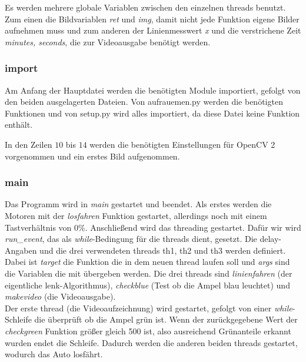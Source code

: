 \documentclass[a4paper, 12pt]{scrartcl}
\begin{document}
Es werden mehrere globale Variablen zwischen den einzelnen threads benutzt. Zum einen die Bildvariablen \textit{ret} und \textit{img}, damit nicht jede Funktion eigene Bilder aufnehmen muss und zum anderen der Linienmesswert \textit{x} und die verstrichene Zeit \textit{minutes, seconds}, die zur Videoausgabe benötigt werden.


\subsubsection{import}	%


Am Anfang der Hauptdatei werden die benötigten Module importiert, gefolgt von den beiden ausgelagerten Dateien. Von aufrauemen.py werden die benötigten Funktionen und von setup.py wird alles importiert, da diese Datei keine Funktion enthält.

In den Zeilen $10$ bis $14$ werden die benötigten Einstellungen für OpenCV 2 vorgenommen und ein erstes Bild aufgenommen.

\newpage
\subsubsection{main}	%


Das Programm wird in \textit{main} gestartet und beendet. Als erstes werden die Motoren mit der \textit{losfahren} Funktion gestartet, allerdings noch mit einem Tastverhältnis von 0\%.
Anschließend wird das threading gestartet. Dafür wir wird \textit{run\_event}, das als \textit{while}-Bedingung für die threads dient, gesetzt. Die delay-Angaben und die drei verwendeten threads th1, th2 und th3 werden definiert. Dabei ist \textit{target} die Funktion die in dem neuen thread laufen soll und \textit{args} sind die Variablen die mit übergeben werden.
Die drei threads sind \textit{linienfahren} (der eigentliche lenk-Algorithmus), \textit{checkblue} (Test ob die Ampel blau leuchtet) und \textit{makevideo} (die Videoausgabe).\\

Der erste thread (die Videoaufzeichnung) wird gestartet, gefolgt von einer \textit{while}-Schleife die überprüft ob die Ampel grün ist. Wenn der zurückgegebene Wert der \textit{checkgreen} Funktion größer gleich 500 ist, also ausreichend Grünanteile erkannt wurden endet die Schleife. Dadurch werden die anderen beiden threads gestartet, wodurch das Auto losfährt.
\end{document}
